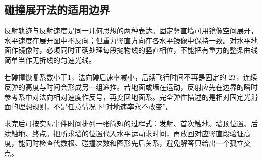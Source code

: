 \subsection{碰撞展开法的适用边界}
反射轨迹与反射速度是同一几何思想的两种表达。固定竖直墙可用镜像空间展开，水平速度在展开图中不反向；但重力竖直方向在各水平镜像中保持一致。对水平地面作镜像时，必须同时正确处理每段抛物线的竖直相位，不能把有重力的整条曲线简单当作无折线的匀速光线。

若碰撞恢复系数小于1，法向碰后速率减小，后续飞行时间不再是固定的 $2T$，连续反弹的高度与时间会形成另一组递推。若地面或墙在运动，反射应先在边界的瞬时参考系中对法向相对速度作反号，再变回地面系。完全弹性描述的是相对固定光滑面的理想规则，不是任意情况下“对地速率永不改变”。

求完后可按实际事件时间排列一张简短的过程式：发射、首次触地、墙顶位置、后续触地、终点。把所求墙的位置代入水平运动求时间，再放回对应竖直段验证高度，能同时检查代数根、碰撞次数和图形先后关系，避免解答只给出一个孤立交点。

